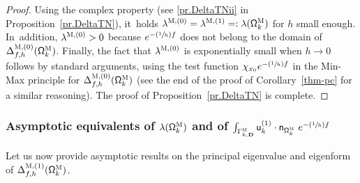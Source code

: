 \documentclass[10pt]{amsart}
\newcommand{\Psfrac}[2]{(\sfrac{#1}{#2})}
\newcommand{\mbf}[1]{\mathbf{#1}}
\theoremstyle{plain}
\theoremstyle{definition}
\begin{document}
\begin{proof}
Using the complex property (see \eqref{pr.DeltaTNii}
in Proposition~\ref{pr.DeltaTN}), it~holds $\lambda^{\textsc{M},
(0)}=\lambda^{\textsc{M}, (1)}=:\lambda(\mathsf \Omega_k^{\textsc{M}})$ for $h$ small enough. In~addition,
$\lambda^{\textsc{M}, (0)}>0$ because $e^{-\Psfrac 1hf}$ does not belong
to the domain of $\Delta_{f,h}^{\textsc{M},(0)}(\mathsf
\Omega_k^{\textsc{M}})$. Finally, the fact that $\lambda^{\textsc{M}, (0)}$ is exponentially
small when $h\to 0$ follows by standard arguments, using the test
function $\chi_{x_0} e^{-\Psfrac 1hf}$ in the Min-Max principle for
$\Delta_{f,h}^{\textsc{M},(0)}(\mathsf \Omega_k^{\textsc{M}})$ (see
the end of the proof of Corollary~\ref{thm-pc} for a similar reasoning). The proof of Proposition~\ref{pr.DeltaTN} is complete. \end{proof}

\subsubsection{Asymptotic equivalents of $\lambda(\mathsf
\Omega_k^{\textsc{M}})$ and of $\int_{\Gamma_{k,\mbf
D}^{\textsc{M}}}\mathsf u^{(1)}_k \cdot \mathsf n_{ \mathsf
\Omega_k^{\textsc{M}} }\ e^{-\Psfrac 1hf}$}\label{sec.equivM}

Let us now provide asymptotic results on the principal eigenvalue and
eigenform of $ \Delta_{f,h}^{\textsc{M},(1)} (\mathsf \Omega_k^{\textsc{M}}) $.
\end{document}
